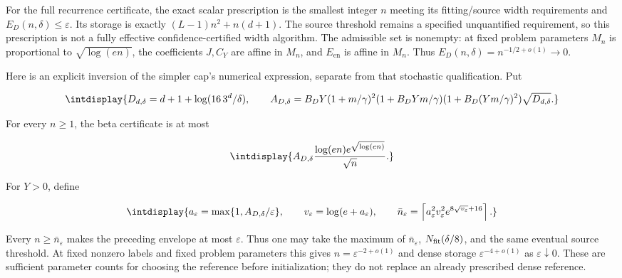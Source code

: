 
For the full recurrence certificate, the exact scalar prescription is the smallest integer \(n\) meeting its fitting/source width requirements and \(E_D(n,\allowbreak \delta)\le\varepsilon\). Its storage is exactly \((L-1)n^2+n(d+1)\). The source threshold remains a specified unquantified requirement, so this prescription is not a fully effective confidence-certified width algorithm. The admissible set is nonempty: at fixed problem parameters \(M_n\) is proportional to \(\sqrt{\log(en)}\), the coefficients \(J,\allowbreak C_Y\) are affine in \(M_n\), and \(E_{\mathrm{en}}\) is affine in \(M_n\). Thus \(E_D(n,\allowbreak \delta)=n^{-1/2+o(1)}\to0\).



Here is an explicit inversion of the simpler cap's numerical expression, separate from that stochastic qualification. Put


\begingroup\renewcommand{\theHequation}{intdisplay.73}
\begin{equation*}
\intdisplay{
D_{d,\delta}=d+1+\log(16\,3^d/\delta),\qquad
A_{D,\delta}=B_DY(1+m/\gamma)^2
(1+B_DYm/\gamma)(1+B_D(Ym/\gamma)^2)\sqrt{D_{d,\delta}}.
}
\end{equation*}
\endgroup


For every \(n\ge1\), the beta certificate is at most


\begingroup\renewcommand{\theHequation}{intdisplay.74}
\begin{equation*}
\intdisplay{
A_{D,\delta}\frac{\log(en)e^{\sqrt{\log(en)}}}{\sqrt n}.
}
\end{equation*}
\endgroup


For \(Y>0\), define


\begingroup\renewcommand{\theHequation}{intdisplay.75}
\begin{equation*}
\intdisplay{
a_\varepsilon=\max\{1,A_{D,\delta}/\varepsilon\},\qquad
v_\varepsilon=\log(e+a_\varepsilon),\qquad
\bar n_\varepsilon=
\left\lceil a_\varepsilon^2v_\varepsilon^2
e^{8\sqrt{v_\varepsilon}+16}\right\rceil.
}
\end{equation*}
\endgroup


Every \(n\ge\bar n_\varepsilon\) makes the preceding envelope at most \(\varepsilon\). Thus one may take the maximum of \(\bar n_\varepsilon\), \(N_{\rm fit}(\delta/8)\), and the same eventual source threshold. At fixed nonzero labels and fixed problem parameters this gives \(n=\varepsilon^{-2+o(1)}\) and dense storage \(\varepsilon^{-4+o(1)}\) as \(\varepsilon\downarrow0\). These are sufficient parameter counts for choosing the reference before initialization; they do not replace an already prescribed dense reference.


